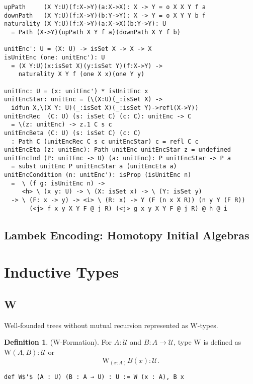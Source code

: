 \documentclass{article}
\theoremstyle{definition}
\newtheorem{definition}{Definition}
\begin{document}
\begin{lstlisting}[mathescape=true]
upPath     (X Y:U)(f:X->Y)(a:X->X): X -> Y = o X X Y f a
downPath   (X Y:U)(f:X->Y)(b:Y->Y): X -> Y = o X Y Y b f
naturality (X Y:U)(f:X->Y)(a:X->X)(b:Y->Y): U
  = Path (X->Y)(upPath X Y f a)(downPath X Y f b)

unitEnc': U = (X: U) -> isSet X -> X -> X
isUnitEnc (one: unitEnc'): U
  = (X Y:U)(x:isSet X)(y:isSet Y)(f:X->Y) ->
    naturality X Y f (one X x)(one Y y)

unitEnc: U = (x: unitEnc') * isUnitEnc x
unitEncStar: unitEnc = (\(X:U)(_:isSet X) ->
  idfun X,\(X Y: U)(_:isSet X)(_:isSet Y)->refl(X->Y))
unitEncRec  (C: U) (s: isSet C) (c: C): unitEnc -> C
  = \(z: unitEnc) -> z.1 C s c
unitEncBeta (C: U) (s: isSet C) (c: C)
  : Path C (unitEncRec C s c unitEncStar) c = refl C c
unitEncEta (z: unitEnc): Path unitEnc unitEncStar z = undefined
unitEncInd (P: unitEnc -> U) (a: unitEnc): P unitEncStar -> P a
  = subst unitEnc P unitEncStar a (unitEncEta a)
unitEncCondition (n: unitEnc'): isProp (isUnitEnc n)
  =  \ (f g: isUnitEnc n) ->
     <h> \ (x y: U) -> \ (X: isSet x) -> \ (Y: isSet y)
  -> \ (F: x -> y) -> <i> \ (R: x) -> Y (F (n x X R)) (n y Y (F R))
       (<j> f x y X Y F @ j R) (<j> g x y X Y F @ j R) @ h @ i
\end{lstlisting}

\subsection{Lambek Encoding: Homotopy Initial Algebras}

\newpage
\section{Inductive Types}

\subsection{W}

Well-founded trees without mutual recursion represented as $\mathrm{W}$-types.

\begin{definition} ($\mathrm{W}$-Formation).
For $A : \mathcal{U}$ and $B : A \rightarrow \mathcal{U}$, type $\mathrm{W}$
is defined as $\mathrm{W}(A,B) : \mathcal{U}$ or
$$
   \mathrm{W}_{(x : A)} B(x) : \mathcal{U}.
$$
\begin{lstlisting}[mathescape=true]
def W$'$ (A : U) (B : A → U) : U := W (x : A), B x
\end{lstlisting}
\end{definition}
\end{document}
